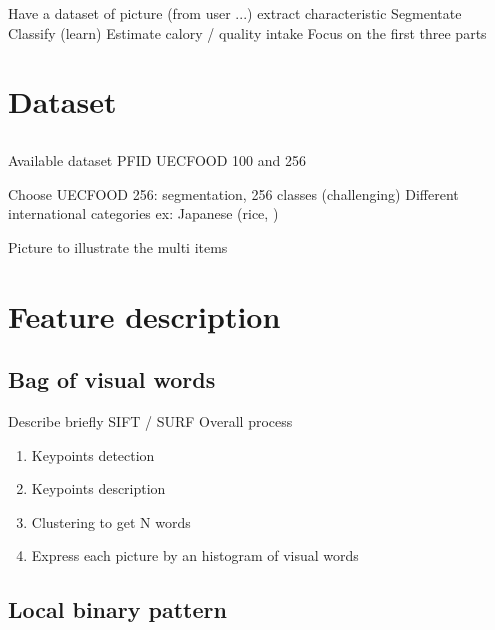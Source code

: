 \documentclass[aspectratio=169]{beamer}
\let\oldsection\section
\renewcommand{\section}[1]{
    \oldsection{#1}	
    \subsection{}
}
\newenvironment{myframe}[1][t]{\begin{frame}[#1]{\secname}{\subsecname}}{\end{frame}}
\begin{document}
    \begin{myframe}
        Have a dataset of picture (from user ...)
        extract characteristic
        Segmentate
        Classify (learn)
        Estimate calory / quality intake
        Focus on the first three parts
    \end{myframe}
    
    \section{Dataset}
    
     \begin{myframe}
         Available dataset
         PFID
         UECFOOD 100 and 256
         
         Choose UECFOOD 256: segmentation, 256 classes (challenging)
         Different international categories ex: Japanese (rice, )
    \end{myframe}
    
    \begin{myframe}
        Picture to illustrate the multi items
    \end{myframe}
    
    \section{Feature description}
    
    \subsection{Bag of visual words}
    
    \begin{myframe}
        Describe briefly SIFT / SURF
        Overall process
        \begin{enumerate}
            \item Keypoints detection
            \item Keypoints description
            \item Clustering to get N words
            \item Express each picture by an histogram of visual words
        \end{enumerate}
    \end{myframe}
    
    \subsection{Local binary pattern}
    
\end{document}
